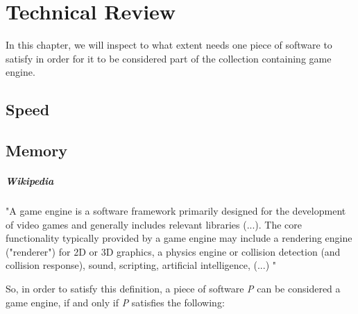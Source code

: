 


\chapter*{Technical Review}


    In this chapter, we will inspect to what extent needs one piece of software to satisfy in order for it to be considered part of the collection containing game engine.
    
    \section*{Speed}
    \section*{Memory}


    \paragraph*{Wikipedia} "A game engine is a software framework primarily designed for the development of video games and generally includes relevant libraries
    (...).
    The core functionality typically provided by a game engine may include a rendering engine ("renderer") for 2D or 3D graphics, a physics engine or collision detection (and collision response), sound, scripting, artificial intelligence, 
    (...)
    "

    So, in order to satisfy this definition, a piece of software \emph{P} can be considered a game engine, if and only if \emph{P} satisfies the following:


